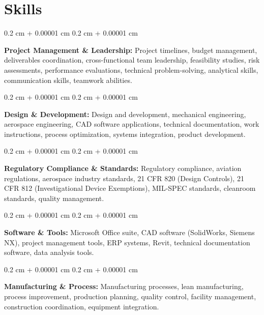 \documentclass[10pt, letterpaper]{article}
\newenvironment{onecolentry}{
    \begin{adjustwidth}{
        0.2 cm + 0.00001 cm
    }{
        0.2 cm + 0.00001 cm
    }
}{
    \end{adjustwidth}
} %
\begin{document}
\vspace{0.4 cm}

    
    \section{Skills}

        \begin{onecolentry}
            \textbf{Project Management \& Leadership:} Project timelines, budget management, deliverables coordination, cross-functional team leadership, feasibility studies, risk assessments, performance evaluations, technical problem-solving, analytical skills, communication skills, teamwork abilities.
        \end{onecolentry}

        \vspace{0.2 cm}

        \begin{onecolentry}
            \textbf{Design \& Development:} Design and development, mechanical engineering, aerospace engineering, CAD software applications, technical documentation, work instructions, process optimization, systems integration, product development.
        \end{onecolentry}

        \vspace{0.2 cm}

        \begin{onecolentry}
            \textbf{Regulatory Compliance \& Standards:} Regulatory compliance, aviation regulations, aerospace industry standards, 21 CFR 820 (Design Controls), 21 CFR 812 (Investigational Device Exemptions), MIL-SPEC standards, cleanroom standards, quality management.
        \end{onecolentry}

        \vspace{0.2 cm}

        \begin{onecolentry}
            \textbf{Software \& Tools:} Microsoft Office suite, CAD software (SolidWorks, Siemens NX), project management tools, ERP systems, Revit, technical documentation software, data analysis tools.
        \end{onecolentry}

        \vspace{0.2 cm}

        \begin{onecolentry}
            \textbf{Manufacturing \& Process:} Manufacturing processes, lean manufacturing, process improvement, production planning, quality control, facility management, construction coordination, equipment integration.
        \end{onecolentry}
\end{document}
